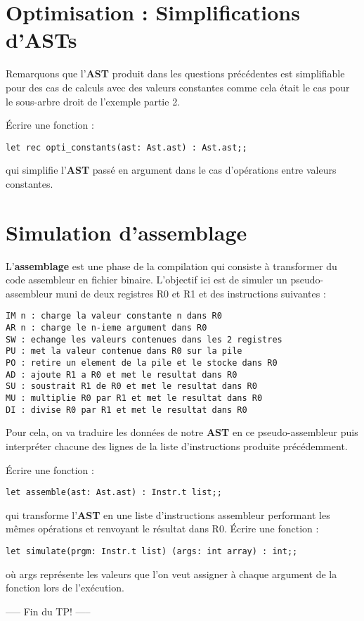 \documentclass[12pt,letterpaper,onecolumn]{exam}
\begin{document}
\section{Optimisation : Simplifications d'ASTs}
Remarquons que l'\textbf{AST} produit dans les questions précédentes est simplifiable pour des cas de calculs avec des valeurs constantes comme cela était le cas pour le sous-arbre droit de l'exemple partie 2.
\begin{questions}
    \question Écrire une fonction :
    \begin{verbatim}
let rec opti_constants(ast: Ast.ast) : Ast.ast;;
    \end{verbatim}
    qui simplifie l'\textbf{AST} passé en argument dans le cas d'opérations entre valeurs constantes.
\end{questions}

\section{Simulation d'assemblage}
L'\textbf{assemblage} est une phase de la compilation qui consiste à transformer du code assembleur en fichier binaire. L'objectif ici est de simuler un pseudo-assembleur muni de deux registres R0 et R1 et des instructions suivantes :
\begin{verbatim}
IM n : charge la valeur constante n dans R0
AR n : charge le n-ieme argument dans R0
SW : echange les valeurs contenues dans les 2 registres
PU : met la valeur contenue dans R0 sur la pile
PO : retire un element de la pile et le stocke dans R0
AD : ajoute R1 a R0 et met le resultat dans R0
SU : soustrait R1 de R0 et met le resultat dans R0
MU : multiplie R0 par R1 et met le resultat dans R0
DI : divise R0 par R1 et met le resultat dans R0
\end{verbatim}
Pour cela, on va traduire les données de notre \textbf{AST} en ce pseudo-assembleur puis interpréter chacune des lignes de la liste d'instructions produite précédemment.
\begin{questions}
    \question Écrire une fonction :
    \begin{verbatim}
let assemble(ast: Ast.ast) : Instr.t list;;
    \end{verbatim}
    qui transforme l'\textbf{AST} en une liste d'instructions assembleur performant les mêmes opérations et renvoyant le résultat dans R0.
    \question Écrire une fonction :
    \begin{verbatim}
let simulate(prgm: Instr.t list) (args: int array) : int;;
    \end{verbatim}
    où args représente les valeurs que l'on veut assigner à chaque argument de la fonction lors de l'exécution.
\end{questions}

\begin{center}
    ----- Fin du TP! -----
\end{center}
\end{document}
